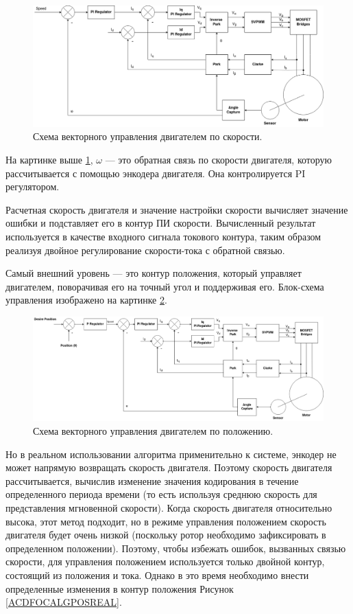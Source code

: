 \begin{figure}[H]
	\centering
	\includegraphics[width=\textwidth]{Src/images/speed.drawio.png}
	\caption{Схема векторного управления двигателем по скорости.}
	\label{ACDFOCALGSPD}
\end{figure}

На картинке выше \ref{ACDFOCALGSPD}, $\omega$  — это обратная связь по скорости двигателя, которую рассчитывается с помощью энкодера двигателя. Она контролируется PI регулятором.

Расчетная скорость двигателя и значение настройки скорости вычисляет значение ошибки и подставляет его в контур ПИ скорости. Вычисленный результат используется в качестве входного сигнала токового контура, таким образом реализуя двойное регулирование скорости-тока с обратной связью.

Самый внешний уровень — это контур положения, который управляет двигателем, поворачивая его на точный угол и поддерживая его. Блок-схема управления изображено на картинке \ref{ACDFOCALGPOS}.

\begin{figure}[H]
	\centering
	\includegraphics[width=\textwidth]{Src/images/Foc pos.drawio.png}
	\caption{Схема векторного управления двигателем по положению.}
	\label{ACDFOCALGPOS}
\end{figure}


Но в реальном использовании алгоритма применительно к системе, энкодер не может напрямую возвращать скорость двигателя. Поэтому скорость двигателя рассчитывается, вычислив изменение значения кодирования в течение определенного периода времени (то есть используя среднюю скорость для представления мгновенной скорости). Когда скорость двигателя относительно высока, этот метод подходит, но в режиме управления положением скорость двигателя будет очень низкой (поскольку ротор необходимо зафиксировать в определенном положении).
Поэтому, чтобы избежать ошибок, вызванных связью скорости, для управления положением  используется только двойной контур, состоящий из положения и тока. Однако в это время необходимо внести определенные изменения в контур положения Рисунок \ref{ACDFOCALGPOSREAL}.

